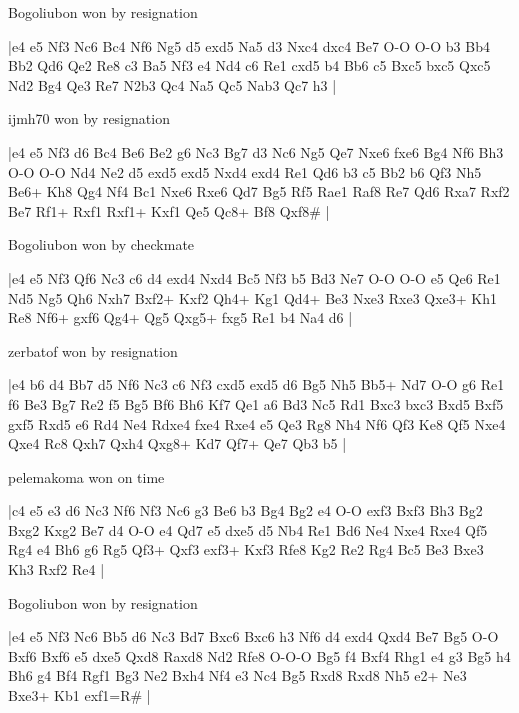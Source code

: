 \showboard

Bogoliubon won by resignation

\makegametitle
|e4 e5 Nf3 Nc6 Bc4 Nf6 Ng5 d5 exd5 Na5 d3 Nxc4 dxc4 Be7 O-O O-O b3 Bb4 Bb2 Qd6 Qe2 Re8 c3 Ba5 Nf3 e4 Nd4 c6 Re1 cxd5 b4 Bb6 c5 Bxc5 bxc5 Qxc5 Nd2 Bg4 Qe3 Re7 N2b3 Qc4 Na5 Qc5 Nab3 Qc7 h3  |

\showboard

ijmh70 won by resignation

\makegametitle
|e4 e5 Nf3 d6 Bc4 Be6 Be2 g6 Nc3 Bg7 d3 Nc6 Ng5 Qe7 Nxe6 fxe6 Bg4 Nf6 Bh3 O-O O-O Nd4 Ne2 d5 exd5 exd5 Nxd4 exd4 Re1 Qd6 b3 c5 Bb2 b6 Qf3 Nh5 Be6+ Kh8 Qg4 Nf4 Bc1 Nxe6 Rxe6 Qd7 Bg5 Rf5 Rae1 Raf8 Re7 Qd6 Rxa7 Rxf2 Be7 Rf1+ Rxf1 Rxf1+ Kxf1 Qe5 Qc8+ Bf8 Qxf8\#  |

\showboard

Bogoliubon won by checkmate

\makegametitle
|e4 e5 Nf3 Qf6 Nc3 c6 d4 exd4 Nxd4 Bc5 Nf3 b5 Bd3 Ne7 O-O O-O e5 Qe6 Re1 Nd5 Ng5 Qh6 Nxh7 Bxf2+ Kxf2 Qh4+ Kg1 Qd4+ Be3 Nxe3 Rxe3 Qxe3+ Kh1 Re8 Nf6+ gxf6 Qg4+ Qg5 Qxg5+ fxg5 Re1 b4 Na4 d6  |

\showboard

zerbatof won by resignation

\makegametitle
|e4 b6 d4 Bb7 d5 Nf6 Nc3 c6 Nf3 cxd5 exd5 d6 Bg5 Nh5 Bb5+ Nd7 O-O g6 Re1 f6 Be3 Bg7 Re2 f5 Bg5 Bf6 Bh6 Kf7 Qe1 a6 Bd3 Nc5 Rd1 Bxc3 bxc3 Bxd5 Bxf5 gxf5 Rxd5 e6 Rd4 Ne4 Rdxe4 fxe4 Rxe4 e5 Qe3 Rg8 Nh4 Nf6 Qf3 Ke8 Qf5 Nxe4 Qxe4 Rc8 Qxh7 Qxh4 Qxg8+ Kd7 Qf7+ Qe7 Qb3 b5  |

\showboard

pelemakoma won on time

\makegametitle
|c4 e5 e3 d6 Nc3 Nf6 Nf3 Nc6 g3 Be6 b3 Bg4 Bg2 e4 O-O exf3 Bxf3 Bh3 Bg2 Bxg2 Kxg2 Be7 d4 O-O e4 Qd7 e5 dxe5 d5 Nb4 Re1 Bd6 Ne4 Nxe4 Rxe4 Qf5 Rg4 e4 Bh6 g6 Rg5 Qf3+ Qxf3 exf3+ Kxf3 Rfe8 Kg2 Re2 Rg4 Bc5 Be3 Bxe3 Kh3 Rxf2 Re4  |

\showboard

Bogoliubon won by resignation

\makegametitle
|e4 e5 Nf3 Nc6 Bb5 d6 Nc3 Bd7 Bxc6 Bxc6 h3 Nf6 d4 exd4 Qxd4 Be7 Bg5 O-O Bxf6 Bxf6 e5 dxe5 Qxd8 Raxd8 Nd2 Rfe8 O-O-O Bg5 f4 Bxf4 Rhg1 e4 g3 Bg5 h4 Bh6 g4 Bf4 Rgf1 Bg3 Ne2 Bxh4 Nf4 e3 Nc4 Bg5 Rxd8 Rxd8 Nh5 e2+ Ne3 Bxe3+ Kb1 exf1=R\#  |

